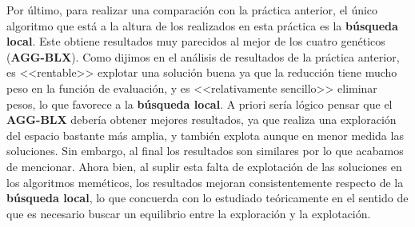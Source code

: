 \documentclass[size=a4, parskip=half, titlepage=false, toc=flat, toc=bib, 12pt]{scrartcl}
\begin{document}
Por último, para realizar una comparación con la práctica anterior, el único algoritmo que está a la altura de los realizados en esta práctica es la \textbf{búsqueda local}. Este obtiene resultados muy parecidos al mejor de los cuatro genéticos (\textbf{AGG-BLX}). Como dijimos en el análisis de resultados de la práctica anterior, es <<rentable>> explotar una solución buena ya que la reducción tiene mucho peso en la función de evaluación, y es <<relativamente sencillo>> eliminar pesos, lo que favorece a la \textbf{búsqueda local}. A priori sería lógico pensar que el \textbf{AGG-BLX} debería obtener mejores resultados, ya que realiza una exploración del espacio bastante más amplia, y también explota aunque en menor medida las soluciones. Sin embargo, al final los resultados son similares por lo que acabamos de mencionar. Ahora bien, al suplir esta falta de explotación de las soluciones en los algoritmos meméticos, los resultados mejoran consistentemente respecto de la \textbf{búsqueda local}, lo que concuerda con lo estudiado teóricamente en el sentido de que es necesario buscar un equilibrio entre la exploración y la explotación.
\end{document}
